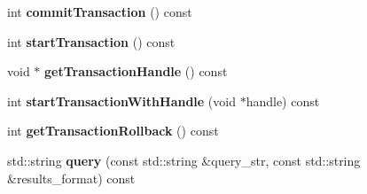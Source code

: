 \begin{DoxyCompactItemize}
int {\bfseries commit\+Transaction} () const
\item 
\mbox{\label{classomexmeta_1_1RDF_afa2b148ecb235b3ac9497fa3b528d2ed}} 
int {\bfseries start\+Transaction} () const
\item 
\mbox{\label{classomexmeta_1_1RDF_ad30bbe5c9b274713f87d4d4a5f2b28e9}} 
void $\ast$ {\bfseries get\+Transaction\+Handle} () const
\item 
\mbox{\label{classomexmeta_1_1RDF_a278b78d5b1b88397c2eb4143f23dab8b}} 
int {\bfseries start\+Transaction\+With\+Handle} (void $\ast$handle) const
\item 
\mbox{\label{classomexmeta_1_1RDF_af5c7c6104496c09762518d56e94e6048}} 
int {\bfseries get\+Transaction\+Rollback} () const
\item 
\mbox{\label{classomexmeta_1_1RDF_ab168be2c14d53c3fc94024121dc88ba6}} 
std\+::string {\bfseries query} (const std\+::string \&query\+\_\+str, const std\+::string \&results\+\_\+format) const
\end{DoxyCompactItemize}
